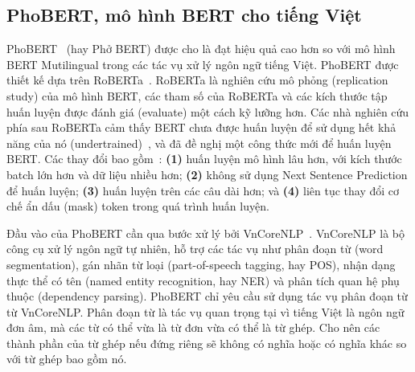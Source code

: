 \subsection{PhoBERT, mô hình BERT cho tiếng Việt}
PhoBERT~\cite{nguyenPhoBERTPretrainedLanguage2020} (hay Phở BERT) được cho là
đạt hiệu quả cao hơn so với mô hình BERT Mutilingual trong các tác vụ xử lý
ngôn ngữ tiếng Việt. PhoBERT được thiết kế dựa trên
RoBERTa~\cite{liuRoBERTaRobustlyOptimized2019}. RoBERTa là nghiên cứu mô phỏng
(replication study) của mô hình BERT, các tham số của RoBERTa và các kích thước
tập huấn luyện được đánh giá (evaluate) một cách kỹ lưỡng hơn. Các nhà nghiên
cứu phía sau RoBERTa cảm thấy BERT chưa được huấn luyện để sử dụng hết khả năng
của nó (undertrained)~\cite{liuRoBERTaRobustlyOptimized2019}, và đã đề nghị một
công thức mới để huấn luyện BERT. Các thay đổi bao
gồm~\cite{liuRoBERTaRobustlyOptimized2019}: \textbf{(1)} huấn luyện mô hình lâu
hơn, với kích thước batch lớn hơn và dữ liệu nhiều hơn; \textbf{(2)} không sử
dụng Next Sentence Prediction để huấn luyện; \textbf{(3)} huấn luyện trên các
câu dài hơn; và \textbf{(4)} liên tục thay đổi cơ chế ẩn dấu (mask) token trong
quá trình huấn luyện.

Đầu vào của PhoBERT cần qua bước xử lý bởi
VnCoreNLP~\cite{vuVnCoreNLPVietnameseNatural2018}. VnCoreNLP là bộ công cụ xử
lý ngôn ngữ tự nhiên, hỗ trợ các tác vụ như phân đoạn từ (word segmentation),
gán nhãn từ loại (part-of-speech tagging, hay POS), nhận dạng thực thể có tên
(named entity recognition, hay NER) và phân tích quan hệ phụ thuộc (dependency
parsing). PhoBERT chỉ yêu cầu sử dụng tác vụ phân đoạn từ từ VnCoreNLP. Phân
đoạn từ là tác vụ quan trọng tại vì tiếng Việt là ngôn ngữ đơn âm, mà các từ có
thể vừa là từ đơn vừa có thể là từ ghép. Cho nên các thành phần của từ ghép nếu
đứng riêng sẽ không có nghĩa hoặc có nghĩa khác so với từ ghép bao gồm nó.
